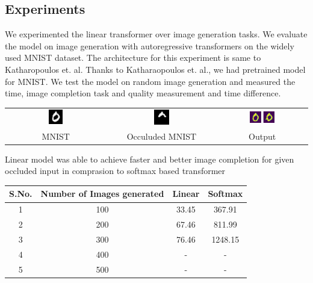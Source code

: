\documentclass{article}
\begin{document}
\subsection{Experiments}
We experimented the linear transformer over image generation tasks. We evaluate the model on image generation with autoregressive transformers on the widely used MNIST dataset. The architecture for this experiment is same to Katharopoulos et. al. Thanks to Katharaopoulos et. al., we had pretrained model for MNIST. We test the model on random image generation and measured the time, image completion task and quality measurement and time difference. 
\begin{center}
    \begin{tabular}{c c c }
		\includegraphics[width=0.15\textwidth]{images/input0.png} & \includegraphics[width=0.15\textwidth]{images/occuluded0.png} & \includegraphics[width=0.3\textwidth]{images/result0.png} &  \\
		MNIST & Occuluded MNIST & Output
    \end{tabular}
\end{center}
    {Linear model was able to achieve faster and better image completion for given occluded input in comprasion to softmax based transformer}

\begin{tabular}{|c|c|c|c|}
    \hline
    S.No. & Number of Images generated & Linear & Softmax \\
    \hline
     1 & 100 & 33.45 & 367.91\\
     2 & 200 & 67.46 & 811.99\\
     3 & 300 & 76.46 & 1248.15\\
     4 & 400 & - & -\\
     5 & 500 & - & -\\
     \hline
\end{tabular}
\end{document}
